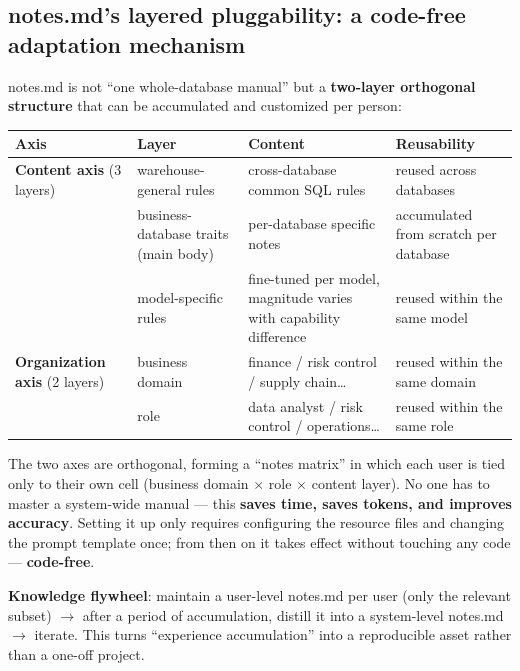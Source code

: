 \documentclass[11pt]{article}
\begin{document}
\subsection{notes.md's layered pluggability: a code-free adaptation mechanism}

notes.md is not ``one whole-database manual'' but a \textbf{two-layer orthogonal structure} that can be accumulated and customized per person:

{\small
\begin{tabular}{@{}
  >{\raggedright\arraybackslash}p{}
  >{\raggedright\arraybackslash}p{}
  >{\raggedright\arraybackslash}p{}
  >{\raggedright\arraybackslash}p{}@{}}
\toprule
Axis & Layer & Content & Reusability \\
\midrule
\textbf{Content axis} (3 layers) & warehouse-general rules & cross-database common SQL rules & reused across databases \\
& business-database traits (main body) & per-database specific notes & accumulated from scratch per database \\
& model-specific rules & fine-tuned per model, magnitude varies with capability difference & reused within the same model \\
\textbf{Organization axis} (2 layers) & business domain & finance / risk control / supply chain\ldots{} & reused within the same domain \\
& role & data analyst / risk control / operations\ldots{} & reused within the same role \\
\bottomrule
\end{tabular}}

The two axes are orthogonal, forming a ``notes matrix'' in which each user is tied only to their own cell (business domain $\times$ role $\times$ content layer). No one has to master a system-wide manual --- this \textbf{saves time, saves tokens, and improves accuracy}. Setting it up only requires configuring the resource files and changing the prompt template once; from then on it takes effect without touching any code --- \textbf{code-free}.

\textbf{Knowledge flywheel}: maintain a user-level notes.md per user (only the relevant subset) $\rightarrow$ after a period of accumulation, distill it into a system-level notes.md $\rightarrow$ iterate. This turns ``experience accumulation'' into a reproducible asset rather than a one-off project.
\end{document}
